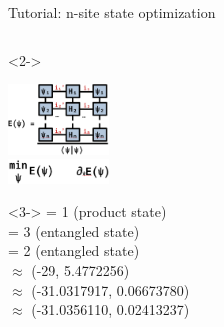 \begin{frame}[fragile]{Tutorial: n-site state optimization}
\begin{columns}
\begin{column}{5.5cm}
\begin{onlyenv}<2->
\vspace*{0.0cm}
\begin{center}
\includegraphics[width=0.2\textwidth]{
  slides/assets/psin_H_psin.png
} \\
\includegraphics[width=0.2\textwidth]{
  slides/assets/min_grad_E_psi.png
}
\end{center}
\vspace*{0.0cm}
\end{onlyenv}

\begin{onlyenv}<3->
= 1 (product state) \\
= 3 (entangled state) \\
= 2 (entangled state) \\
$\approx$ (-29, 5.4772256) \\
$\approx$ (-31.0317917, 0.06673780) \\
$\approx$ (-31.0356110, 0.02413237)
\end{onlyenv}

\end{column}

\end{columns}

\end{frame}
